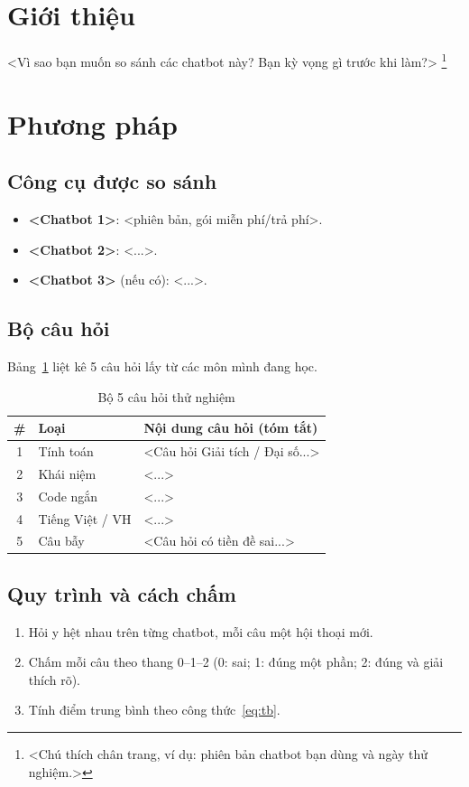 \documentclass[12pt,a4paper]{article}
\begin{document}
\section{Giới thiệu}
<Vì sao bạn muốn so sánh các chatbot này? Bạn kỳ vọng gì trước khi làm?>%
\footnote{<Chú thích chân trang, ví dụ: phiên bản chatbot bạn dùng
và ngày thử nghiệm.>}  %

\section{Phương pháp}
\subsection{Công cụ được so sánh}
\begin{itemize}
  \item \textbf{<Chatbot 1>}: <phiên bản, gói miễn phí/trả phí>.
  \item \textbf{<Chatbot 2>}: <...>.
  \item \textbf{<Chatbot 3>} (nếu có): <...>.
\end{itemize}

\subsection{Bộ câu hỏi}
Bảng~\ref{tab:cauhoi} liệt kê 5 câu hỏi lấy từ các môn mình đang học.

\begin{table}[H]
  \centering
  \caption{Bộ 5 câu hỏi thử nghiệm}
  \label{tab:cauhoi}
  \begin{tabular}{clp{8cm}}
    \toprule
    \# & Loại & Nội dung câu hỏi (tóm tắt) \\
    \midrule
    1 & Tính toán        & <Câu hỏi Giải tích / Đại số...> \\
    2 & Khái niệm        & <...> \\
    3 & Code ngắn        & <...> \\
    4 & Tiếng Việt / VH  & <...> \\
    5 & Câu bẫy          & <Câu hỏi có tiền đề sai...> \\
    \bottomrule
  \end{tabular}
\end{table}

\subsection{Quy trình và cách chấm}
\begin{enumerate}
  \item Hỏi y hệt nhau trên từng chatbot, mỗi câu một hội thoại mới.
  \item Chấm mỗi câu theo thang 0--1--2
        (0: sai; 1: đúng một phần; 2: đúng và giải thích rõ).
  \item Tính điểm trung bình theo công thức~\eqref{eq:tb}.
\end{enumerate}
\end{document}
